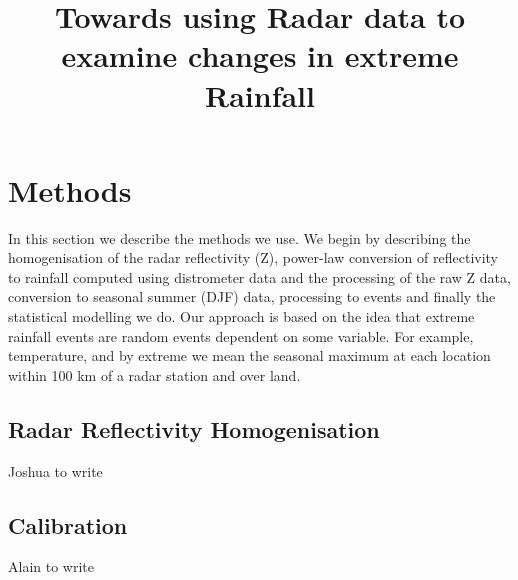 \documentclass{ametsocV5}
\title{Towards using Radar data to examine changes in extreme Rainfall}
\affiliation{School of Geosciences, University of Edinburgh \& UNSW, Sydney}
\begin{document}
\maketitle

%
%
%


%

\section{Methods}
\label{sect:Methods}
In this section we describe the methods we use.  We begin by describing the homogenisation of the radar reflectivity (Z), power-law conversion of reflectivity to rainfall computed using distrometer data and the processing of the raw Z data, conversion to seasonal summer (DJF) data, processing to events and finally the statistical modelling we do.  Our approach is based on the idea that extreme rainfall events are random events dependent on some variable. For example, temperature, and by extreme we mean the seasonal maximum at each location within 100 km of a radar station and over land. 

\subsection{Radar Reflectivity Homogenisation}
\label{subsect:homogenisation}
Joshua to write

\subsection{Calibration}
\label{subsect:calibrate}
Alain to write
\end{document}
